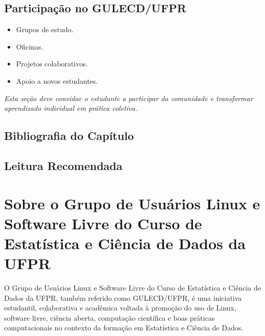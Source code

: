\documentclass[12pt,openany]{book}
\newcommand{\placeholder}[1]{
    \par\medskip
    \noindent\textit{#1}
    \par\medskip
}
\newcommand{\topicos}[1]{
    \begin{itemize}
        #1
    \end{itemize}
}
\begin{document}
\begin{refsection}
\section{Participação no GULECD/UFPR}

\topicos{
    \item Grupos de estudo.
    \item Oficinas.
    \item Projetos colaborativos.
    \item Apoio a novos estudantes.
}

\placeholder{Esta seção deve convidar o estudante a participar da comunidade e transformar aprendizado individual em prática coletiva.}

\cleardoublepage
\section*{Bibliografia do Capítulo}
\printbibliography[
    heading=none,
    notcategory=recomendadosProximosPassos
]

\section*{Leitura Recomendada}
\nocite{lacroixLinuxMintEssentials2014,jrLinuxCommandLine2012}
\printbibliography[
    heading=none,
    category=recomendadosProximosPassos
]
\end{refsection}


\cleardoublepage
\printglossary[title={Glossário},toctitle={Glossário}]


\cleardoublepage
\chapter*{Sobre o Grupo de Usuários Linux e Software Livre do Curso de Estatística e Ciência de Dados da UFPR}

O Grupo de Usuários Linux e Software Livre do Curso de Estatística e Ciência de Dados da UFPR, também referido como GULECD/UFPR, é uma iniciativa estudantil, colaborativa e acadêmica voltada à promoção do uso de Linux, software livre, ciência aberta, computação científica e boas práticas computacionais no contexto da formação em Estatística e Ciência de Dados.
\end{document}

